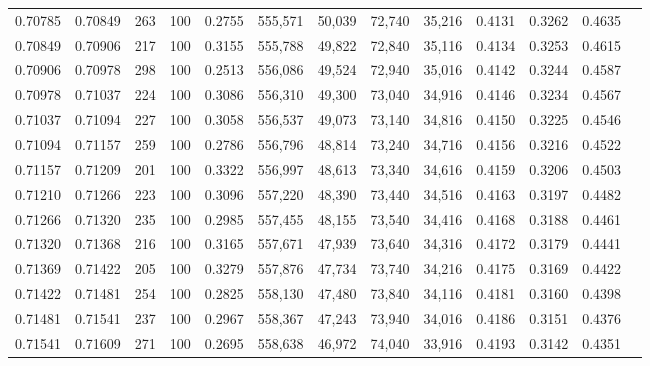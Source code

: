 \begin{tabular}{rrrrrrrrrrrrr}
0.70785 & 0.70849 &   263 & 100 &                                     0.2755 & 555,571 &  50,039 &  72,740 &  35,216 & 0.4131 & 0.3262 & 0.4635 \\
0.70849 & 0.70906 &   217 & 100 &                                     0.3155 & 555,788 &  49,822 &  72,840 &  35,116 & 0.4134 & 0.3253 & 0.4615 \\
0.70906 & 0.70978 &   298 & 100 &                                     0.2513 & 556,086 &  49,524 &  72,940 &  35,016 & 0.4142 & 0.3244 & 0.4587 \\
0.70978 & 0.71037 &   224 & 100 &                                     0.3086 & 556,310 &  49,300 &  73,040 &  34,916 & 0.4146 & 0.3234 & 0.4567 \\
0.71037 & 0.71094 &   227 & 100 &                                     0.3058 & 556,537 &  49,073 &  73,140 &  34,816 & 0.4150 & 0.3225 & 0.4546 \\
0.71094 & 0.71157 &   259 & 100 &                                     0.2786 & 556,796 &  48,814 &  73,240 &  34,716 & 0.4156 & 0.3216 & 0.4522 \\
0.71157 & 0.71209 &   201 & 100 &                                     0.3322 & 556,997 &  48,613 &  73,340 &  34,616 & 0.4159 & 0.3206 & 0.4503 \\
0.71210 & 0.71266 &   223 & 100 &                                     0.3096 & 557,220 &  48,390 &  73,440 &  34,516 & 0.4163 & 0.3197 & 0.4482 \\
0.71266 & 0.71320 &   235 & 100 &                                     0.2985 & 557,455 &  48,155 &  73,540 &  34,416 & 0.4168 & 0.3188 & 0.4461 \\
0.71320 & 0.71368 &   216 & 100 &                                     0.3165 & 557,671 &  47,939 &  73,640 &  34,316 & 0.4172 & 0.3179 & 0.4441 \\
0.71369 & 0.71422 &   205 & 100 &                                     0.3279 & 557,876 &  47,734 &  73,740 &  34,216 & 0.4175 & 0.3169 & 0.4422 \\
0.71422 & 0.71481 &   254 & 100 &                                     0.2825 & 558,130 &  47,480 &  73,840 &  34,116 & 0.4181 & 0.3160 & 0.4398 \\
0.71481 & 0.71541 &   237 & 100 &                                     0.2967 & 558,367 &  47,243 &  73,940 &  34,016 & 0.4186 & 0.3151 & 0.4376 \\
0.71541 & 0.71609 &   271 & 100 &                                     0.2695 & 558,638 &  46,972 &  74,040 &  33,916 & 0.4193 & 0.3142 & 0.4351 \\

\end{tabular}
